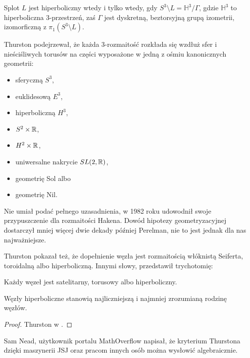 \begin{proposition}
    Splot $L$ jest hiperboliczny wtedy i tylko wtedy, gdy $S^3 \setminus L = \mathbb H^3 / \Gamma$, gdzie $\mathbb H^3$ to hiperboliczna 3-przestrzeń, zaś $\Gamma$ jest dyskretną, beztorsyjną grupą izometrii, izomorficzną z $\pi_1(S^3 \setminus L)$.
\end{proposition}

Thurston podejrzewał, że każda 3-rozmaitość rozkłada się wzdłuż sfer i nieściśliwych torusów na części wyposażone w jedną z ośmiu kanonicznych geometrii:
\begin{itemize}
\item sferyczną $S^3$,
\item euklidesową $E^3$,
\item hiperboliczną $H^3$,
\item $S^2 \times \mathbb R$,
\item $H^2 \times \mathbb R$,
\item uniwersalne nakrycie $SL(2, \mathbb R)$,
\item geometrię Sol albo
\item geometrię Nil.
\end{itemize}
Nie umiał podać pełnego uzasadnienia, w 1982 roku udowodnił swoje przypuszczenie dla rozmaitości Hakena.
Dowód hipotezy geometryzacyjnej dostarczył mniej więcej dwie dekady później Perelman, nie to jest jednak dla nas najważniejsze.

Thurston pokazał też, że dopełnienie węzła jest rozmaitością włóknistą Seiferta, toroidalną albo hiperboliczną.
Innymi słowy, przedstawił trychotomię:
\begin{theorem}
    Każdy węzeł jest satelitarny, torusowy albo hiperboliczny.
\end{theorem}

Węzły hiperboliczne stanowią najliczniejszą i najmniej zrozumianą rodzinę węzłów.

\begin{proof}
    Thurston w \cite{thurston82}.
\end{proof}

Sam Nead, użytkownik portalu MathOverflow napisał, że kryterium Thurstona dzięki maszynerii JSJ oraz pracom innych osób można wysłowić algebraicznie.

